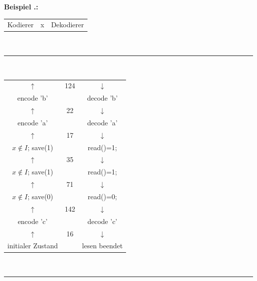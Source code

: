 \documentclass[a4paper,12pt]{article}
\newcounter{Beispiel}
\newenvironment{Beispiel}{
\medskip
        
        \setlength{\parindent}{0pt}
        \addtocounter{Beispiel}{1}
        \textbf{\textsf{Beispiel \thesubsection.\theBeispiel}:}\\}{
        \nopagebreak
        \vspace{-1.0ex}
        \bigskip
        
}
\begin{document}
\begin{Beispiel}
\begin{center}
\begin{tabular}{c c c}
Kodierer & x & Dekodierer
\end{tabular}
\vspace{-0.2cm}
\\
{\color{gray!50!blue}\rule{8cm}{0.1mm}}
\\
\begin{tabular}{c c c}
$\uparrow$ & 124 & $\downarrow$
\\
encode 'b' & & decode 'b'
\\
$\uparrow$ & 22 & $\downarrow$
\\
encode 'a' & & decode 'a'
\\
$\uparrow$ & 17 & $\downarrow$
\\
$x \not\in I$; save(1) &  &  read()=1;
\\
$\uparrow$ & 35 & $\downarrow$
\\
$x \not\in I$; save(1) &  & read()=1;
\\
$\uparrow$ & 71 & $\downarrow$
\\
$x \not\in I$; save(0) &  &  read()=0;
\\
$\uparrow$ & 142 & $\downarrow$
\\
encode 'c' & & decode 'c'
\\
$\uparrow$ & 16  & $\downarrow$
\\
initialer Zustand & & lesen beendet
\end{tabular}
\\
{\color{gray!50!red}\rule{8cm}{0.1mm}}
\end{center}
\end{Beispiel}
\end{document}
